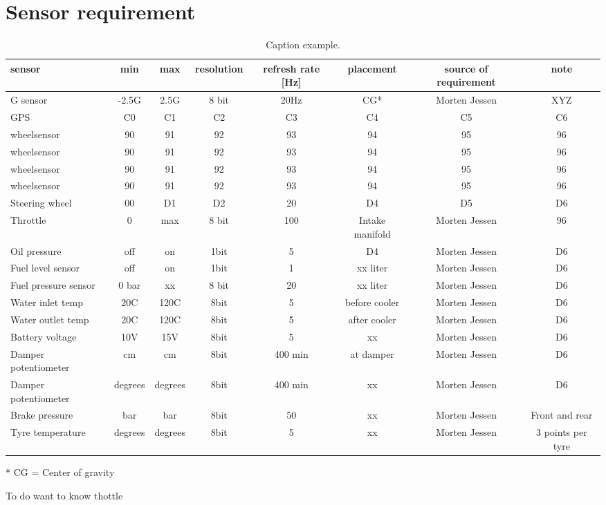 \chapter{Sensor requirement}


\begin{sidewaystable}[htbp]
\centering
\begin{tabular} {l @{}c @{}c @{}c @{}c @{}c @{}c @{}c@{}}
\toprule
sensor & min	& max 	& resolution 	& refresh rate [Hz]	& placement 	& source of requirement & note	\\
\midrule
G sensor 	& -2.5G	& 2.5G	& 8 bit	 & 20Hz & CG* & Morten Jessen & XYZ\\
GPS 	& C0	& C1	& C2	& C3	& C4	& C5	& C6 \\
wheelsensor & 90	& 91	& 92	& 93	& 94	& 95	& 96 \\
wheelsensor & 90	& 91	& 92	& 93	& 94	& 95	& 96 \\
wheelsensor & 90	& 91	& 92	& 93	& 94	& 95	& 96 \\
wheelsensor & 90	& 91	& 92	& 93	& 94	& 95	& 96 \\
Steering wheel & 00	& D1	& D2	& 20		& D4				& D5			& D6 \\
Throttle  		& 0	& max	& 8 bit	&  100	& Intake manifold 	& Morten Jessen	& 96  \\
Oil pressure & off	& on	& 1bit 	& 5		& D4				& Morten Jessen			& D6 \\
Fuel level sensor & off	& on	& 1bit 	& 1		&  xx liter			& Morten Jessen			& D6 \\
Fuel pressure sensor & 0 bar	& xx	& 8 bit 	& 20		&  xx liter			& Morten Jessen			& D6 \\
Water inlet temp & 20C	& 120C	& 8bit 	& 5		&  before cooler			& Morten Jessen			& D6 \\
Water outlet temp & 20C	& 120C	& 8bit 	& 5		&  after cooler			& Morten Jessen			& D6 \\
Battery voltage & 10V	& 15V	& 8bit 	& 5		&  xx			& Morten Jessen			& D6 \\
Damper potentiometer & cm	& cm	& 8bit 	& 400 min		&  at damper			& Morten Jessen			& D6 \\
Damper potentiometer & degrees	& degrees	& 8bit 	& 400 min		&  xx			& Morten Jessen			& D6 \\
Brake pressure & bar	& bar	& 8bit 	& 50		&  xx			& Morten Jessen			& Front and rear \\
Tyre temperature & degrees	& degrees	& 8bit 	& 5		&  xx			& Morten Jessen			& 3 points per tyre \\
\bottomrule
\end{tabular}
\caption{Caption example.}
\label{tab:label_example}
\end{sidewaystable}


* CG = Center of gravity 

To do 
want to know thottle 
